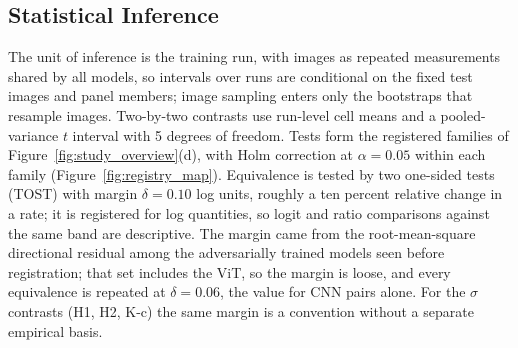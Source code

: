 \subsection{Statistical Inference}
\label{subsec:statistics}

The unit of inference is the training run, with images as repeated measurements shared by all models, so intervals over runs are conditional on the fixed test images and panel members; image sampling enters only the bootstraps that resample images. Two-by-two contrasts use run-level cell means and a pooled-variance $t$ interval with 5 degrees of freedom. Tests form the registered families of Figure~\ref{fig:study_overview}(d), with Holm correction at $\alpha = 0.05$ within each family (Figure~\ref{fig:registry_map}). Equivalence is tested by two one-sided tests (TOST) with margin $\delta = 0.10$ log units, roughly a ten percent relative change in a rate; it is registered for log quantities, so logit and ratio comparisons against the same band are descriptive. The margin came from the root-mean-square directional residual among the adversarially trained models seen before registration; that set includes the ViT, so the margin is loose, and every equivalence is repeated at $\delta = 0.06$, the value for CNN pairs alone. For the $\sigma$ contrasts (H1, H2, K-c) the same margin is a convention without a separate empirical basis.

